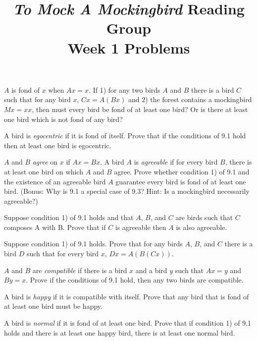 \documentclass[12pt, letterpaper]{article}
\title{\emph{To Mock A Mockingbird} Reading Group\\Week 1 Problems}
\begin{document}
\maketitle

\begin{prob}{9.1}
$A$ is fond of $x$ when $Ax = x$. If 1) for any two birds $A$ and $B$ there is a bird $C$ such that for any bird $x$, $Cx = A(Bx)$ and 2) the forest contains a mockingbird $Mx = xx$, then must every bird be fond of at least one bird? Or is there at least one bird which is not fond of any bird?
\end{prob}

\begin{prob}{9.2}
A bird is \emph{egocentric} if it is fond of itself. Prove that if the conditions of 9.1 hold then at least one bird is egocentric.
\end{prob}

\begin{prob}{9.3}
$A$ and $B$ \emph{agree} on $x$ if $Ax = Bx$. A bird $A$ is \emph{agreeable} if for every bird $B$, there is at least one bird on which $A$ and $B$ agree. Prove whether condition 1) of 9.1 and the existence of an agreeable bird $A$ guarantee every bird is fond of at least one bird. (Bonus: Why is 9.1 a special case of 9.3? Hint: Is a mockingbird necessarily agreeable?)
\end{prob}

\begin{prob}{9.4}
Suppose condition 1) of 9.1 holds and that $A$, $B$, and $C$ are birds such that $C$ composes A with B. Prove that if $C$ is agreeable then $A$ is also agreeable.
\end{prob}

\begin{prob}{9.5}
Suppose condition 1) of 9.1 holds. Prove that for any birds $A$, $B$, and $C$ there is a bird $D$ such that for every bird $x$, $Dx = A(B(Cx))$.
\end{prob}

\begin{prob}{9.6}
$A$ and $B$ are \emph{compatible} if there is a bird $x$ and a bird $y$ such that $Ax = y$ and $By = x$. Prove if the conditions of 9.1 hold, then any two birds are compatible.
\end{prob}

\begin{prob}{9.7}
A bird is \emph{happy} if it is compatible with itself. Prove that any bird that is fond of at least one bird must be happy.
\end{prob}

\begin{prob}{9.8}
A bird is \emph{normal} if it is fond of at least one bird. Prove that if condition 1) of 9.1 holds and there is at least one happy bird, there is at least one normal bird.
\end{prob}
\end{document}
